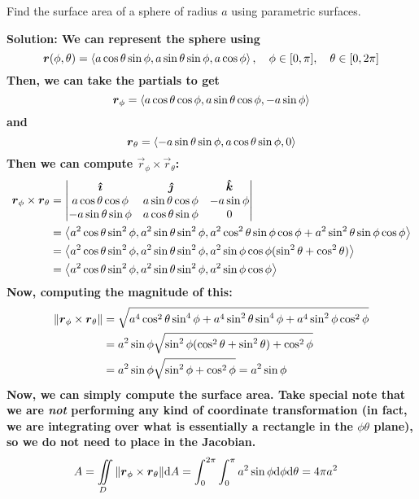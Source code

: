 \begin{example}
    Find the surface area of a sphere of radius $a$ using parametric surfaces.\par
    \bf{Solution:} We can represent the sphere using
    \[ \boldsymbol{r}(\phi, \theta) = \left\langle a\cos\theta\sin\phi, a\sin\theta\sin\phi, a\cos\phi\right\rangle, \quad \phi\in[0,\pi], \quad \theta\in[0,2\pi]\]
    Then, we can take the partials to get 
    \[ \boldsymbol{r}_\phi = \left\langle a\cos\theta\cos\phi, a\sin\theta\cos\phi, -a\sin\phi \right\rangle \]
    and
    \[ \boldsymbol{r}_\theta = \left\langle -a\sin\theta\sin\phi, a\cos\theta\sin\phi, 0\right\rangle\]
    Then we can compute $\vec r_\phi \times \vec r_\theta$:
    \begin{align*}
        \boldsymbol{r}_\phi \times \boldsymbol{r}_\theta &= \begin{vmatrix} \boldsymbol{\hat{\imath}} & \boldsymbol{\hat{\jmath}} & \boldsymbol{\hat{k}} \\ a\cos\theta\cos\phi & a\sin\theta\cos\phi & -a\sin\phi \\ -a\sin\theta\sin\phi & a\cos\theta\sin\phi & 0\end{vmatrix} \\
        &= \left\langle a^2\cos\theta\sin^2\phi, a^2\sin\theta\sin^2\phi, a^2\cos^2\theta\sin\phi\cos\phi + a^2\sin^2\theta\sin\phi\cos\phi\right\rangle \\
        &= \left\langle a^2\cos\theta\sin^2\phi, a^2\sin\theta\sin^2\phi, a^2\sin\phi\cos\phi(\sin^2\theta + \cos^2\theta)\right\rangle \\
        &= \left\langle a^2\cos\theta\sin^2\phi, a^2\sin\theta\sin^2\phi, a^2\sin\phi\cos\phi\right\rangle
    \end{align*}
    Now, computing the magnitude of this:
    \begin{align*}
        \norm{\boldsymbol{r}_\phi \times \boldsymbol{r}_\theta} &= \sqrt{a^4\cos^2\theta\sin^4\phi + a^4\sin^2\theta\sin^4\phi + a^4\sin^2\phi\cos^2\phi} \\
        &= a^2\sin\phi\sqrt{\sin^2\phi(\cos^2\theta+\sin^2\theta)+\cos^2\phi} \\
        &= a^2\sin\phi\sqrt{\sin^2\phi+\cos^2\phi} = a^2\sin\phi
    \end{align*}
    Now, we can simply compute the surface area. Take special note that we are \textit{not} performing any kind of coordinate transformation (in fact, we are integrating over what is essentially a rectangle in the $\phi\theta$ plane), so we do not need to place in the Jacobian.
    \begin{align*}
        A = \iint\limits_D \norm{\boldsymbol{r}_\phi\times\boldsymbol{r}_\theta}\dd A &= \int_0^{2\pi} \int_0^\pi a^2\sin\phi \dd \phi \dd \theta = 4\pi a^2
    \end{align*}
\end{example}
